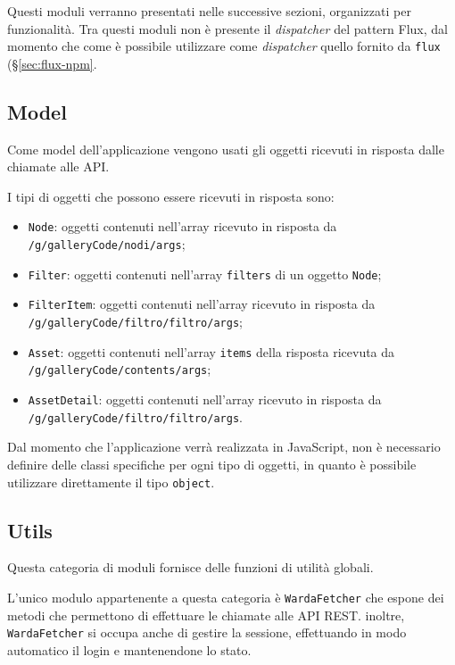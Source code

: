 Questi moduli verranno presentati nelle successive sezioni, organizzati per funzionalità.
Tra questi moduli non è presente il \textit{dispatcher} del pattern Flux, dal momento che come è possibile utilizzare come \textit{dispatcher} quello fornito da \texttt{flux} (§\ref{sec:flux-npm}.

\subsection{Model}

Come model dell'applicazione vengono usati gli oggetti ricevuti in risposta dalle chiamate alle API.

I tipi di oggetti che possono essere ricevuti in risposta sono:
\begin{itemize}
\item \texttt{Node}: oggetti contenuti nell'array ricevuto in risposta da \texttt{/g/{galleryCode}/nodi/{args}};
\item \texttt{Filter}: oggetti contenuti nell'array \texttt{filters} di un oggetto \texttt{Node};
\item \texttt{FilterItem}: oggetti contenuti nell'array ricevuto in risposta da \texttt{/g/{galleryCode}/filtro/{filtro}/{args}};
\item \texttt{Asset}: oggetti contenuti nell'array \texttt{items} della risposta ricevuta da \texttt{/g/{galleryCode}/contents/{args}};
\item \texttt{AssetDetail}: oggetti contenuti nell'array ricevuto in risposta da \texttt{/g/{galleryCode}/filtro/{filtro}/{args}}.
\end{itemize}

Dal momento che l'applicazione verrà realizzata in JavaScript, non è necessario definire delle classi specifiche per ogni tipo di oggetti, in quanto è possibile utilizzare direttamente il tipo \texttt{object}.

\subsection{Utils}

Questa categoria di moduli fornisce delle funzioni di utilità globali.

L'unico modulo appartenente a questa categoria è \texttt{WardaFetcher} che espone dei metodi che permettono di effettuare le chiamate alle API REST.
inoltre, \texttt{WardaFetcher} si occupa anche di gestire la sessione, effettuando in modo automatico il login e mantenendone lo stato.

